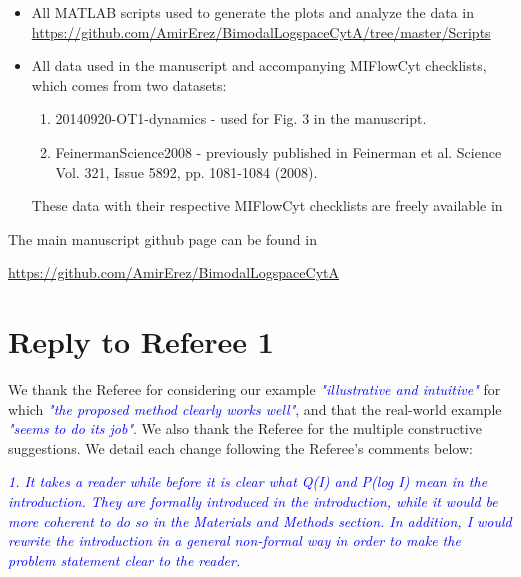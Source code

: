 \documentclass[letter,11pt,draft]{article}
\newcommand{\re}[1]{\emph{\textcolor{blue}{#1}}}
\begin{document}
\begin{itemize}
\item All MATLAB scripts used to generate the plots and analyze the data in
\\
{\small \href{https://github.com/AmirErez/BimodalLogspaceCytA/tree/master/Scripts}{https://github.com/AmirErez/BimodalLogspaceCytA/tree/master/Scripts}}
\item All data used in the manuscript and accompanying MIFlowCyt checklists, which comes from two datasets:
	\begin{enumerate}
	\item 20140920-OT1-dynamics - used for Fig. 3 in the manuscript.
	\item FeinermanScience2008 - previously published in Feinerman et al. Science Vol. 321, Issue 5892, pp. 1081-1084 (2008). 
	\end{enumerate}
These data with their respective MIFlowCyt checklists are freely available in

\smallskip
{}

\end{itemize} 

\smallskip
The main manuscript github page can be found in

\smallskip
\href{https://github.com/AmirErez/BimodalLogspaceCytA}{https://github.com/AmirErez/BimodalLogspaceCytA}
\newpage

\section*{Reply to Referee 1}

We thank the Referee for considering our example \re{"illustrative and intuitive"} for which \re{"the proposed method clearly works well"}, and that the real-world example \re{"seems to do its job"}. We also thank the Referee for the multiple constructive suggestions. We detail each change following the Referee's comments below:

\smallskip

\re{1. It takes a reader while before it is clear what Q(I) and P(log I) mean in the introduction. They are formally introduced in the introduction, while it would be more coherent to do so in the Materials and Methods section. In addition, I would rewrite the introduction in a general non-formal way in order to make the problem statement clear to the reader.}
\end{document}
